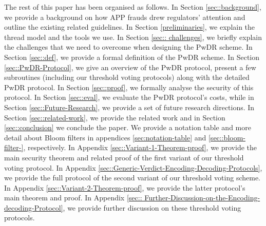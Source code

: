 

\vspace{2mm}

The rest of this paper has been organised as follows.  In Section \ref{sec::background}, we provide a background on how  APP frauds drew regulators' attention and outline the existing related guidelines. In Section \ref{preliminaries}, we explain the thread model and  the  tools we use. In Section \ref{sec:: challenges}, we briefly explain the challenges that  we need to overcome when designing  the PwDR scheme.  In Section \ref{sec::def}, we provide a formal definition of the PwDR scheme. In Section \ref{sec::PwDR-Protocol}, we give an overview of  the PwDR protocol, present a few subroutines (including our threshold voting protocols) along with the detailed PwDR protocol. In Section \ref{sec::proof}, we formally analyse the security of this protocol. In Section \ref{sec::eval}, we evaluate the PwDR protocol's costs, while in Section \ref{sec::Future-Research}, we provide a set of future research directions. In Section \ref{sec::related-work}, we provide the related work and in Section \ref{sec::conclusion} we conclude the paper. We provide a notation table and more detail about Bloom filters in appendices \ref{sec:notation-table} and \ref{sec::bloom-filter-}, respectively. In Appendix \ref{sec::Variant-1-Theorem-proof}, we provide the main security theorem and related  proof of the first variant of   our threshold voting protocol.  In Appendix \ref{sec::Generic-Verdict-Encoding-Decoding-Protocols}, we provide the full protocol of the second variant of our  threshold voting scheme. In Appendix \ref{sec::Variant-2-Theorem-proof}, we provide the latter protocol's main theorem and proof. In Appendix \ref{sec:: Further-Discussion-on-the-Encoding-decoding-Protocol}, we provide further discussion on these threshold voting protocols. 
